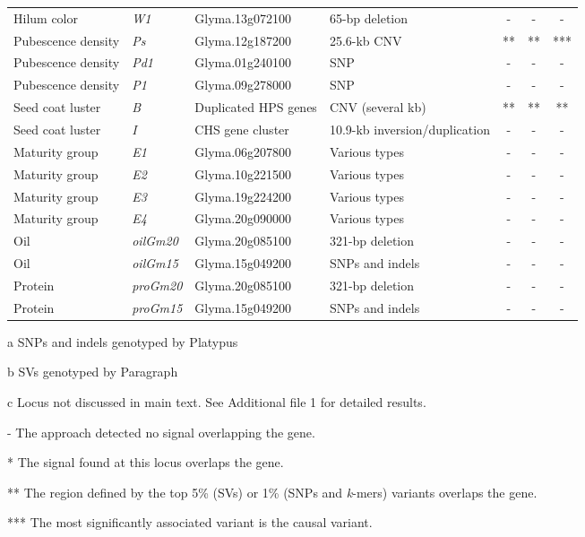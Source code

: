 \documentclass{article}
\begin{document}
\begin{landscape}
\begin{table}[p]
\begin{threeparttable}
\begin{tabular}{llllccc}
		Hilum color\tnote{c} & \textit{W1} & Glyma.13g072100 & 65-bp deletion \citep{zabala2007} & - & - & - \\
		Pubescence density & \textit{Ps} & Glyma.12g187200 & 25.6-kb CNV \citep{liu2020ps} & ** & ** & *** \\
		Pubescence density\tnote{c} & \textit{Pd1} & Glyma.01g240100 & SNP \citep{liu2020ps} & - & - & - \\
		Pubescence density\tnote{c} & \textit{P1} & Glyma.09g278000 & SNP \citep{liu2020ps} & - & - & - \\
		Seed coat luster & \textit{B} & Duplicated HPS genes & CNV (several kb) \citep{gijzen2006} & ** & ** & ** \\
		Seed coat luster\tnote{c} & \textit{I} & CHS gene cluster & 10.9-kb inversion/duplication \citep{tuteja2008} & - & - & - \\
		Maturity group\tnote{c} & \textit{E1} & Glyma.06g207800 & Various types \citep{tardivel2019} & - & - & - \\
		Maturity group\tnote{c} & \textit{E2} & Glyma.10g221500 & Various types \citep{tardivel2019} & - & - & - \\
		Maturity group\tnote{c} & \textit{E3} & Glyma.19g224200 & Various types \citep{tardivel2019} & - & - & - \\
		Maturity group\tnote{c} & \textit{E4} & Glyma.20g090000 & Various types \citep{tardivel2019} & - & - & - \\
		Oil\tnote{c} & \textit{oilGm20} & Glyma.20g085100 & 321-bp deletion \citep{fliege2022} & - & - & - \\
		Oil\tnote{c} & \textit{oilGm15} & Glyma.15g049200 & SNPs and indels \citep{zhang2020} & - & - & - \\
		Protein\tnote{c} & \textit{proGm20} & Glyma.20g085100 & 321-bp deletion \citep{fliege2022} & - & - & - \\
		Protein\tnote{c} & \textit{proGm15} & Glyma.15g049200 & SNPs and indels \citep{zhang2020} & - & - & - \\
		\bottomrule
		\end{tabular}

		\begin{tablenotes}
		\item[a] SNPs and indels genotyped by Platypus
		\item[b] SVs genotyped by Paragraph
		\item[c] Locus not discussed in main text. See Additional file 1 for detailed results.
		\item[]- The approach detected no signal overlapping the gene.
		\item[]* The signal found at this locus overlaps the gene.
		\item[]** The region defined by the top 5\% (SVs) or 1\% (SNPs and \textit{k}-mers) variants overlaps the gene.
		\item[]*** The most significantly associated variant is the causal variant.
		\end{tablenotes}


\end{threeparttable}
\end{table}
\end{landscape}
\end{document}

